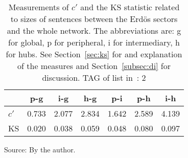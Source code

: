 \begin{table}[h!]
\begin{center}
\caption{Measurements of $c'$ and the KS statistic related to sizes of sentences between the Erd\"os sectors and the whole network. The abbreviations are: g for global, p for peripheral, i for intermediary, h for hubs. See Section~\ref{sec:ks} for and explanation of the measures and Section~\ref{subsec:di} for discussion. TAG of list in~\cite{textTables}: 2}
\begin{tabular}{l || c | c | c | c | c | c}\hline
{\bf } & {\bf p-g} & {\bf i-g} & {\bf h-g} & {\bf p-i} & {\bf p-h} & {\bf i-h} \\\hline\hline
$c'$ & 0.733  & 2.077  & 2.834  & 1.642  & 2.589  & 4.139 \\
KS & 0.020  & 0.038  & 0.059  & 0.048  & 0.080  & 0.097 \\\hline
\end{tabular}
\begin{flushleft}\footnotesize
Source: By the author.\
\end{flushleft}
\end{center}
\end{table}

